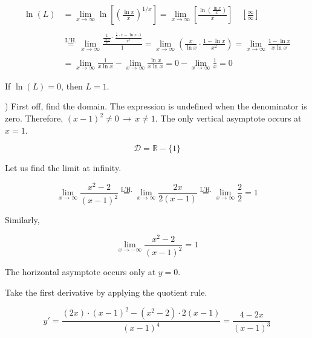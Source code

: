 \documentclass{article}
\begin{document}
\begin{align*}\ln(L)&=\lim_{x\to \infty} \ln\left[\left(\frac{\ln x}x\right)^{1/x}\right]=\lim_{x\to \infty} \left[\frac{\ln\left(\frac{\ln x}x\right)}x\right]\quad\left[\frac\infty\infty\right]\\\\&\overset{\text{L'H.}}{=}\lim_{x\to\infty} \frac{\frac1{\frac{\ln x}{x}}\cdot\frac{\frac1x\cdot x -\ln x\cdot 1}{x^2}}{1}=\lim_{x\to\infty}\left({\frac x{\ln x}\cdot\frac{1-\ln x}{x^2}}\right)=\lim_{x\to\infty}\frac{1-\ln x}{x\ln x}\\\\&=\lim_{x\to\infty}\frac1{x\ln x} - \lim_{x\to\infty}\frac{\ln x}{x\ln x}=0-\lim_{x\to\infty}\frac1x=0\end{align*}

\hfill

\noindent If $\ln(L) = 0$, then $\boxed{L = 1}$.

\hfill

) First off, find the domain. The expression is undefined when the denominator is zero. Therefore, $(x-1)^2\neq0\,\rightarrow\,x\neq1$. The only vertical asymptote occurs at $x = 1$.

\begin{equation*}\mathcal{D} = \mathbb{R} - \{1\}\end{equation*}

\hfill

\noindent Let us find the limit at infinity.

\begin{equation*}\lim_{x\to \infty}\frac{x^2-2}{(x-1)^2} \overset{\text{L'H.}}{=} \lim_{x\to \infty} \frac{2x}{2(x-1)} \overset{\text{L'H.}}{=} \lim_{x\to \infty} \frac{2}{2}=1\end{equation*}

\noindent Similarly,

\begin{equation*}\lim_{x\to -\infty}\frac{x^2-2}{(x-1)^2}=1\end{equation*}

\hfill

\noindent The horizontal asymptote occurs only at $y=0$.

\hfill

\noindent Take the first derivative by applying the quotient rule.

\begin{equation*}y' = \frac{(2x)\cdot (x-1)^2 - (x^2-2)\cdot 2(x-1)}{(x-1)^4}=\frac{4-2x}{(x-1)^3}\end{equation*}
\end{document}

